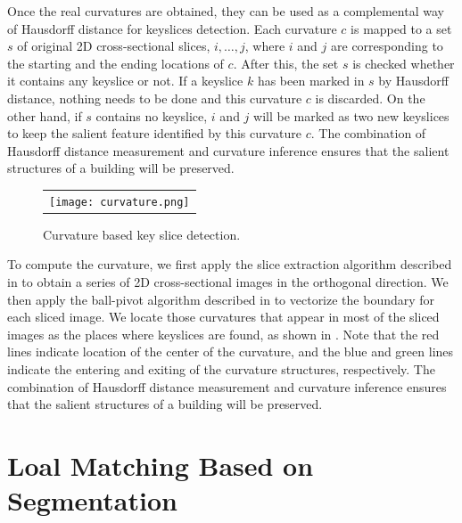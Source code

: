 Once the real curvatures are obtained, they can be used as a complemental way of 
Hausdorff distance for keyslices detection. 
Each curvature $c$ is mapped to a set $s$ of original 2D cross-sectional
slices, $i,\ldots,j$, where $i$ and $j$ are corresponding to the starting and 
the ending locations of $c$. After this, the set $s$ is checked whether 
it contains any keyslice or not.
If a keyslice $k$ has been marked in $s$ by Hausdorff distance, 
nothing needs to be done and this curvature $c$ is discarded. 
On the other hand, if $s$ contains no keyslice, $i$ and $j$ will be marked as 
two new keyslices to keep the salient feature identified by this curvature $c$.
The combination of Hausdorff distance measurement and curvature inference
ensures that the salient structures of a building will be preserved.

\begin{figure}[htbp]
\begin{center}
\begin{tabular}{c}
\texttt{[image: curvature.png]}
\end{tabular}
\end{center}
\caption{ Curvature based key slice detection. }
\label{fig:KSD_Curv}
\end{figure}

To compute the curvature, we first apply the slice extraction algorithm
described in  to obtain a series of 2D cross-sectional
images in the orthogonal direction.
We then apply the ball-pivot algorithm described in  to
vectorize the boundary for each sliced image.
We locate those curvatures that appear in most of the sliced images as the
places where keyslices are found, as shown in .
Note that the red lines indicate location of the center of the curvature,
and the blue and green lines indicate the entering and exiting of the
curvature structures, respectively.
The combination of Hausdorff distance measurement and curvature inference
ensures that the salient structures of a building will be preserved.

\section{Loal Matching Based on Segmentation}

